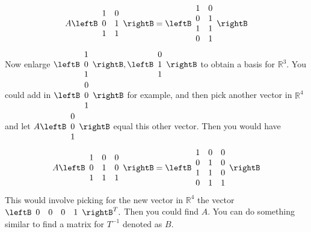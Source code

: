\begin{enumialphparenastyle}
\begin{ex}
\begin{equation*}
A\leftB 
\begin{array}{cc}
1 & 0 \\ 
0 & 1 \\ 
1 & 1
\end{array}
\rightB =\leftB 
\begin{array}{cc}
1 & 0 \\ 
0 & 1 \\ 
1 & 1 \\ 
0 & 1
\end{array}
\rightB
\end{equation*}
Now enlarge $\leftB 
\begin{array}{c}
1 \\ 
0 \\ 
1
\end{array}
\rightB ,\leftB 
\begin{array}{c}
0 \\ 
1 \\ 
1
\end{array}
\rightB $ to obtain a basis for $\mathbb{R}^{3}$. You could add in $\leftB 
\begin{array}{c}
0 \\ 
0 \\ 
1
\end{array}
\rightB $ for example, and then pick another vector in $\mathbb{R}^{4}$ and
let $A\leftB 
\begin{array}{c}
0 \\ 
0 \\ 
1
\end{array}
\rightB $ equal this other vector. Then you would have 
\begin{equation*}
A\leftB 
\begin{array}{ccc}
1 & 0 & 0 \\ 
0 & 1 & 0 \\ 
1 & 1 & 1
\end{array}
\rightB =\leftB 
\begin{array}{ccc}
1 & 0 & 0 \\ 
0 & 1 & 0 \\ 
1 & 1 & 0 \\ 
0 & 1 & 1
\end{array}
\rightB
\end{equation*}
This would involve picking for the new vector in $\mathbb{R}^{4}$ the vector 
$\leftB 
\begin{array}{cccc}
0 & 0 & 0 & 1
\end{array}
\rightB ^{T}.$ Then you could find $A$. You can do something similar to find
a matrix for $T^{-1}$ denoted as $B$.
\end{ex}

\end{enumialphparenastyle}